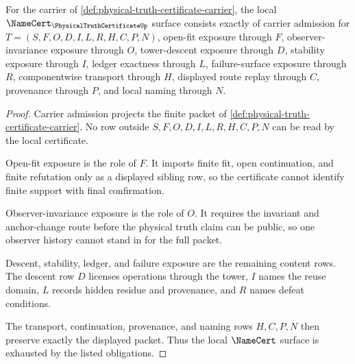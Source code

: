 \begin{theorem}
\label{thm:physical-truth-certificate-namecert-obligations}
For the carrier of \autoref{def:physical-truth-certificate-carrier}, the local $\NameCert_{\PhysicalTruthCertificateUp}$ surface consists exactly of carrier admission for $T=(S,F,O,D,I,L,R,H,C,P,N)$, open-fit exposure through $F$, observer-invariance exposure through $O$, tower-descent exposure through $D$, stability exposure through $I$, ledger exactness through $L$, failure-surface exposure through $R$, componentwise transport through $H$, displayed route replay through $C$, provenance through $P$, and local naming through $N$.
\end{theorem}
\begin{proof}
Carrier admission projects the finite packet of \autoref{def:physical-truth-certificate-carrier}. No row outside $S,F,O,D,I,L,R,H,C,P,N$ can be read by the local certificate.

Open-fit exposure is the role of $F$. It imports finite fit, open continuation, and finite refutation only as a displayed sibling row, so the certificate cannot identify finite support with final confirmation.

Observer-invariance exposure is the role of $O$. It requires the invariant and anchor-change route before the physical truth claim can be public, so one observer history cannot stand in for the full packet.

Descent, stability, ledger, and failure exposure are the remaining content rows. The descent row $D$ licenses operations through the tower, $I$ names the reuse domain, $L$ records hidden residue and provenance, and $R$ names defeat conditions.

The transport, continuation, provenance, and naming rows $H,C,P,N$ then preserve exactly the displayed packet. Thus the local $\NameCert$ surface is exhausted by the listed obligations.
\end{proof}

